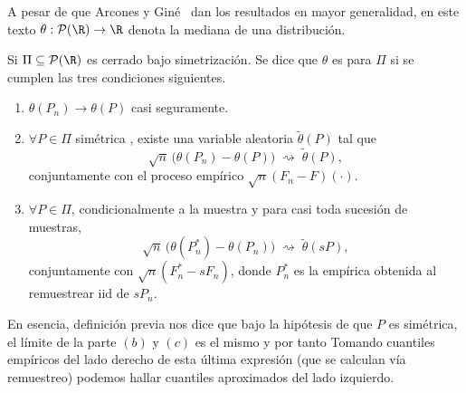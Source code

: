 A pesar de que Arcones y Giné~\cite{arcones1991bootstrap} dan los resultados en mayor generalidad, en este texto $\theta:\mathcal{P(\R) \to \R}$ denota la mediana de una distribución.



\begin{definicion}
Si $\Pi\s \mathcal{P}(\R)$ es cerrado bajo simetrización. Se dice que $\theta$ es  para
$\Pi$ si se cumplen las tres condiciones siguientes.
\begin{enumerate}
  \item[\textup{(a)}] $\theta(P_n)\to\theta(P)$ casi seguramente.
  \item[\textup{(b)}] $\forall P\in\Pi$ simétrica , existe una variable aleatoria
        $\widetilde{\theta}(P)$ tal que
        \[
          \sqrt{n}\,\bigl(\theta(P_n)-\theta(P)\bigr)\;\rightsquigarrow\;\widetilde{\theta}(P),
        \]
        conjuntamente con el proceso empírico $\sqrt{n}(F_n-F)(\cdot)$. 
  \item[\textup{(c)}]  $\forall P\in\Pi$, condicionalmente a la muestra y para casi toda
        sucesión de muestras,
        \[
          \sqrt{n}\,\bigl(\theta(P_n^{*})-\theta(P_n)\bigr)\;\rightsquigarrow\;
          \widetilde{\theta}(sP),
        \]
        conjuntamente con $\sqrt{n}(F_n^{*}-sF_n)$, donde $P_n^{*}$ es la empírica
        obtenida al remuestrear iid de $sP_n$.
\end{enumerate}
\end{definicion}

\begin{observacion}
    En esencia, definición previa nos dice que bajo la hipótesis de que $P$ es simétrica, el límite de la parte $(b)$ y $(c)$ es el mismo y por tanto 
    Tomando cuantiles empíricos del lado derecho de esta última expresión (que se calculan vía remuestreo) podemos hallar cuantiles aproximados del lado izquierdo.
\end{observacion}


